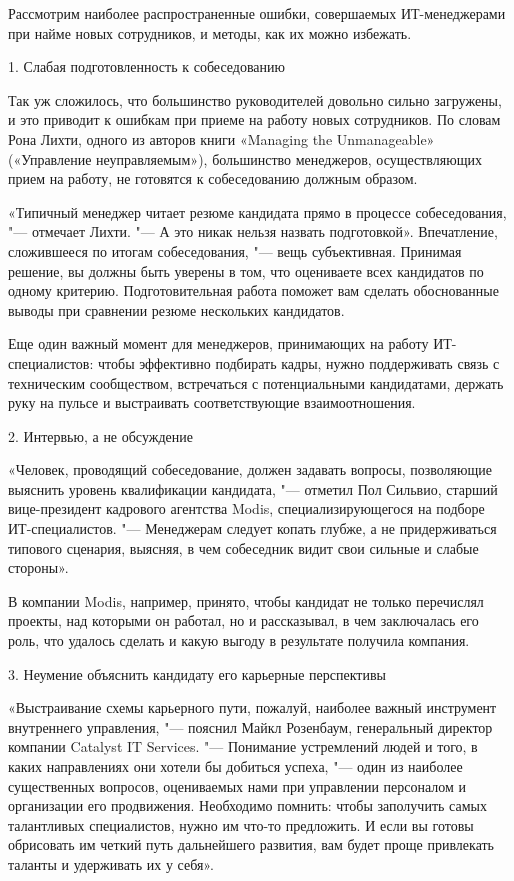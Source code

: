\documentclass{../industrial-development}
\begin{document}
\lecturenotes

Рассмотрим наиболее распространенные ошибки, совершаемых ИТ-менеджерами при найме новых сотрудников, и методы, как их можно избежать.

1. \alert{Слабая подготовленность к собеседованию}

Так уж сложилось, что большинство руководителей довольно сильно загружены, и это приводит к ошибкам при приеме на работу новых сотрудников. По словам Рона Лихти, одного из авторов книги «Managing the Unmanageable» («Управление неуправляемым»), большинство менеджеров, осуществляющих прием на работу, не готовятся к собеседованию должным образом.

«Типичный менеджер читает резюме кандидата прямо в процессе собеседования, "--- отмечает Лихти. "--- А это никак нельзя назвать подготовкой». Впечатление, сложившееся по итогам собеседования, "--- вещь субъективная. Принимая решение, вы должны быть уверены в том, что оцениваете всех кандидатов по одному критерию. Подготовительная работа поможет вам сделать обоснованные выводы при сравнении резюме нескольких кандидатов.

Еще один важный момент для менеджеров, принимающих на работу ИТ-специалистов: чтобы эффективно подбирать кадры, нужно поддерживать связь с техническим сообществом, встречаться с потенциальными кандидатами, держать руку на пульсе и выстраивать соответствующие взаимоотношения.

2. \alert{Интервью, а не обсуждение}

«Человек, проводящий собеседование, должен задавать вопросы, позволяющие выяснить уровень квалификации кандидата, "--- отметил Пол Сильвио, старший вице-президент кадрового агентства Modis, специализирующегося на подборе ИТ-специалистов. "--- Менеджерам следует копать глубже, а не придерживаться типового сценария, выясняя, в чем собеседник видит свои сильные и слабые стороны».

В компании Modis, например, принято, чтобы кандидат не только перечислял проекты, над которыми он работал, но и рассказывал, в чем заключалась его роль, что удалось сделать и какую выгоду в результате получила компания.

3. \alert{Неумение объяснить кандидату его карьерные перспективы}

«Выстраивание схемы карьерного пути, пожалуй, наиболее важный инструмент внутреннего управления, "--- пояснил Майкл Розенбаум, генеральный директор компании Catalyst IT Services. "--- Понимание устремлений людей и того, в каких направлениях они хотели бы добиться успеха, "--- один из наиболее существенных вопросов, оцениваемых нами при управлении персоналом и организации его продвижения. Необходимо помнить: чтобы заполучить самых талантливых специалистов, нужно им что-то предложить. И если вы готовы обрисовать им четкий путь дальнейшего развития, вам будет проще привлекать таланты и удерживать их у себя».
\end{document}

